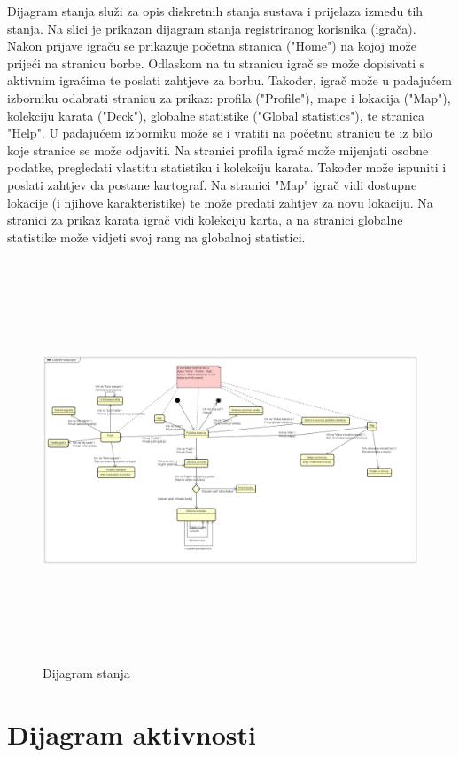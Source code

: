 		{Dijagram stanja služi za opis diskretnih stanja sustava i prijelaza između tih stanja. Na slici je prikazan dijagram stanja registriranog korisnika (igrača). Nakon prijave igraču se prikazuje početna stranica ("Home") na kojoj može prijeći na stranicu borbe. Odlaskom na tu stranicu igrač se može dopisivati s aktivnim igračima te poslati zahtjeve za borbu. Također, igrač može u padajućem izborniku odabrati stranicu za prikaz: profila ("Profile"), mape i lokacija ("Map"), kolekciju karata ("Deck"), globalne statistike ("Global statistics"), te stranica "Help". U padajućem izborniku može se i vratiti na početnu stranicu te iz bilo koje stranice se može odjaviti. Na stranici profila igrač može mijenjati osobne podatke, pregledati vlastitu statistiku i kolekciju karata. Također može ispuniti i poslati zahtjev da postane kartograf. Na stranici "Map" igrač vidi dostupne lokacije (i njihove karakteristike) te može predati zahtjev za novu lokaciju. Na stranici za prikaz karata igrač vidi kolekciju karta, a na stranici globalne statistike može vidjeti svoj rang na globalnoj statistici. }
			\begin{figure}[H]
				\includegraphics[width=18cm, height=12cm]{dijagrami/dijagram stanja-igrač}				
				\centering
				\caption{Dijagram stanja}
				\label{}
			\end{figure}
			\eject 
		
		\section{Dijagram aktivnosti}
			
